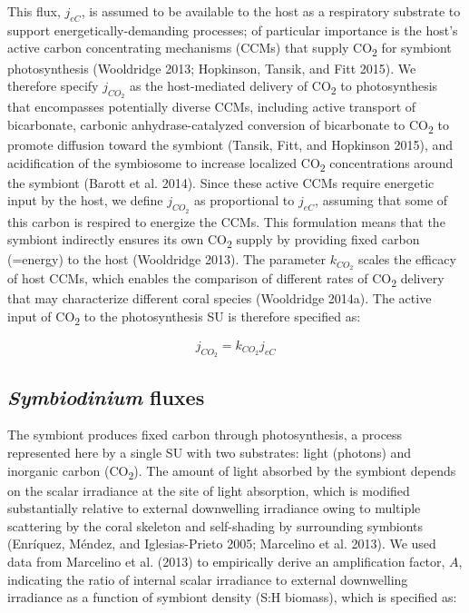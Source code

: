 \documentclass[]{elsarticle} %
\begin{document}
This flux, \(j_{eC}\), is assumed to be available to the host as a
respiratory substrate to support energetically-demanding processes; of
particular importance is the host's active carbon concentrating
mechanisms (CCMs) that supply CO\textsubscript{2} for symbiont
photosynthesis (Wooldridge 2013; Hopkinson, Tansik, and Fitt 2015). We
therefore specify \(j_{CO_2}\) as the host-mediated delivery of
CO\textsubscript{2} to photosynthesis that encompasses potentially
diverse CCMs, including active transport of bicarbonate, carbonic
anhydrase-catalyzed conversion of bicarbonate to CO\textsubscript{2} to
promote diffusion toward the symbiont (Tansik, Fitt, and Hopkinson
2015), and acidification of the symbiosome to increase localized
CO\textsubscript{2} concentrations around the symbiont (Barott et al.
2014). Since these active CCMs require energetic input by the host, we
define \(j_{CO_2}\) as proportional to \(j_{eC}\), assuming that some of
this carbon is respired to energize the CCMs. This formulation means
that the symbiont indirectly ensures its own CO\textsubscript{2} supply
by providing fixed carbon (=energy) to the host (Wooldridge 2013). The
parameter \(k_{CO_2}\) scales the efficacy of host CCMs, which enables
the comparison of different rates of CO\textsubscript{2} delivery that
may characterize different coral species (Wooldridge 2014a). The active
input of CO\textsubscript{2} to the photosynthesis SU is therefore
specified as:

\begin{equation} j_{CO_2} = k_{CO_2}j_{eC} \end{equation}

\subsection{\texorpdfstring{\emph{Symbiodinium}
fluxes}{Symbiodinium fluxes}}\label{symbiodinium-fluxes}

The symbiont produces fixed carbon through photosynthesis, a process
represented here by a single SU with two substrates: light (photons) and
inorganic carbon (CO\textsubscript{2}). The amount of light absorbed by
the symbiont depends on the scalar irradiance at the site of light
absorption, which is modified substantially relative to external
downwelling irradiance owing to multiple scattering by the coral
skeleton and self-shading by surrounding symbionts (Enríquez, Méndez,
and Iglesias-Prieto 2005; Marcelino et al. 2013). We used data from
Marcelino et al. (2013) to empirically derive an amplification factor,
\(A\), indicating the ratio of internal scalar irradiance to external
downwelling irradiance as a function of symbiont density (S:H biomass),
which is specified as:
\end{document}
